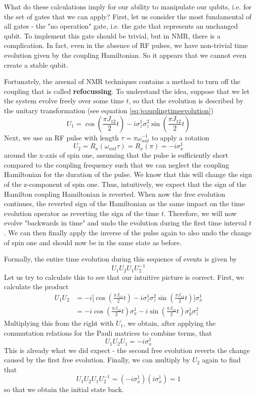 \documentclass[a4paper, draft]{article}
\theoremstyle{own}
\theoremstyle{remark}
\begin{document}
What do these calculations imply for our ability to manipulate our qubits, i.e. for the set of gates that we can apply? First, let us consider the most fundamental of all gates - the "no operation" gate, i.e. the gate that represents an unchanged qubit. To implement this gate should be trivial, but in NMR, there is a complication. In fact, even in the absence of RF pulses, we have non-trivial time evolution given by the coupling Hamiltonian. So it appears that we cannot even create a stable qubit.

Fortunately, the arsenal of NMR techniques contains a method to turn off the coupling that is called {\bf refocussing}. To understand the idea, suppose that we let the system evolve freely over some time $t$, so that the evolution is described by the unitary transformation (see equation \eqref{eq:jcouplingtimeevolution})
$$
U_1 = \cos (\frac{\pi J_{12}}{2} t) -i \sigma_z^1 \sigma_z^2 \sin (\frac{\pi J_{12}}{2}  t)
$$
Next, we use an RF pulse with length $\tau = \pi \omega_{nut}^{-1}$ to apply a rotation
$$
U_2 = R_x(\omega_{nut} \tau) = R_x(\pi) = - i \sigma_x^1
$$
around the x-axis of spin one, assuming that the pulse is sufficiently short compared to the coupling frequency such that we can neglect the coupling Hamiltonian for the duration of the pulse. We know that this will change the sign of the z-component of spin one. Thus, intuitively, we expect that the sign of the Hamilton coupling Hamiltonian is reverted. When now the free evolution continues, the reverted sign of the Hamiltonian as the same impact on the time evolution operator as reverting the sign of the time $t$. Therefore, we will now evolve "backwards in time" and undo the evolution during the first time interval $t$. We can then finally apply the inverse of the pulse again to also undo the change of spin one and should now be in the same state as before. 

Formally, the entire time evolution during this sequence of events is given by
$$
U_1 U_2 U_1 U_2^{-1}
$$
Let us try to calculate this to see that our intuitive picture is correct. First, we calculate the product 
\begin{align*}
U_1 U_2 &= -i \big[ \cos (\frac{\pi J_{12}}{2} t) -i \sigma_z^1 \sigma_z^2 \sin (\frac{\pi J_{12}}{2}  t) \big] \sigma_x^1 \\
&= -i \cos (\frac{\pi J_{12}}{2} t) \sigma_x^1 - i \sin (\frac{\pi J_{12}}{2}  t) \sigma_y^1 \sigma_z^2
\end{align*}
Multiplying this from the right with $U_1$, we obtain, after applying the commutation relations for the Pauli matrices to combine terms, that
$$
U_1 U_2 U_1 = -i \sigma_x^1
$$
This is already what we did expect - the second free evolution reverts the change caused by the first free evolution. Finally, we can multiply by $U_2$ again to find that
$$
U_1 U_2 U_1 U_2^{-1} = (-i \sigma_x^1)(i \sigma_x^1) = 1
$$
so that we obtain the initial state back.
\end{document}
